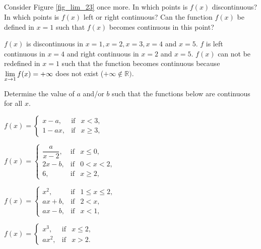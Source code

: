 \subsection*{}


\ifanalysis
\begin{Exercise}[difficulty = 1, label = oef_grafiek_cont] Consider Figure \ref{fig_lim_23} once more. In which points is $f(x)$ discontinuous? In which points is $f(x)$ left or right continuous? Can the function $f(x)$ be defined in $x=1$ such that $f(x)$ becomes continuous in this point? 

\end{Exercise}

\begin{Answer}\phantom{}
    $f(x)$ is discontinuous in $x=1, x=2, x=3, x=4$ and $x=5$. $f$ is left continuous in $x=4$ and right continuous in $x=2$ and $x=5$.
    $f(x)$ can not be redefined in $x=1$ such that the function becomes continuous because $\displaystyle\lim_{x \rightarrow 1} f(x) = + \infty$ does not exist ($+\infty \notin \mathbb{R})$.
\end{Answer}
\fi


\ifanalysis
\pagebreak
\begin{Exercise} Determine the value of $a$ and/or $b$ such that the functions below are continuous for all $x$.
\begin{multicols}{2}
    \Question[difficulty = 1] $f(x)=\left\{\begin{array}{lcl}
    x-a,  & \mbox{if} & x < 3, \\[0.2cm]
    1-ax,  & \mbox{if} & x \geq 3, 
    \end{array}\right.$
    
    \Question[difficulty = 1] $f(x)=\left\{\begin{array}{lcl}
    \dfrac{a}{x-2},  & \mbox{if} &x \leq 0, \\[0.2cm]
    2x-b,  & \mbox{if} & 0 < x < 2, \\[0.2cm]
    6,  & \mbox{if} & x \geq 2,
    \end{array}\right.$
    
    \Question[difficulty = 2] $f(x)=\left\{\begin{array}{lcl}
    x^2,  & \mbox{if} & 1 \leq x \leq 2, \\[0.2cm]
    ax+b,  & \mbox{if} & 2 < x, \\[0.2cm]
    ax-b,  & \mbox{if} & x < 1,
    \end{array}\right.$
    
    \Question[difficulty = 1] $f(x)=\left\{\begin{array}{lcl}
    x^3,  & \mbox{if} & x \leq 2, \\[0.2cm]
    ax^2,  & \mbox{if} & x > 2.
    \end{array}\right.$
    
    \EndCurrentQuestion
\end{multicols}

\end{Exercise}

